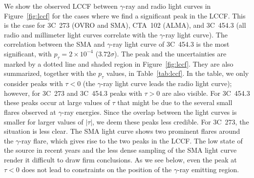\documentclass[twocolumn]{aastex62}
\newcommand{\gray}{$\gamma$-ray\xspace}
\begin{document}
We show the observed LCCF between \gray and radio light curves in Figure~\ref{fig:lccf} for the cases where we find a significant peak in the LCCF. This is the case for 3C~273 (OVRO and SMA), CTA~102 (ALMA), and 3C~454.3 (all radio and millimeter light curves correlate with the \gray light curve).
The correlation between the SMA and \gray light curve of 3C~454.3 is the most significant, with $p_\tau = 2\times10^{-4}$ ($3.72\sigma$). 
The peak and the uncertainties are marked by a dotted line and shaded region in Figure~\ref{fig:lccf}.
They are also summarized, together with the $p_\tau$ values, in Table~\ref{tab:lccf}.
In the table, we only consider peaks with $\tau < 0$ (the \gray light curve leads the radio light curve); however, 
for 3C~273 and 3C~454.3 peaks with $\tau > 0$ are also visible. 
For 3C~454.3 these peaks occur at large values of $\tau$ that might be due to the several small flares observed at \gray energies. Since the overlap between the light curves is smaller for larger values of $|\tau|$, we deem these peaks less credible. 
For 3C~273, the situation is less clear. 
The SMA light curve shows two prominent flares around the 
\gray flare, which gives rise to the two peaks in the LCCF. 
The low state of the source in recent years and the less dense sampling of the SMA light curve render it difficult to draw firm conclusions. As we see below, even the peak at $\tau < 0$ does not lead to constraints on the position of the \gray emitting region.
\end{document}
